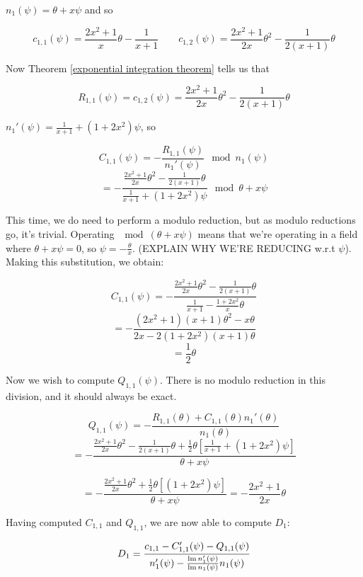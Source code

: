 $n_1(\psi) = \theta + x \psi$ and so

$$c_{1,1}(\psi) = \frac{2x^2+1}{x}\theta - \frac{1}{x+1} \qquad
c_{1,2}(\psi) = \frac{2x^2 + 1}{2x}\theta^2 - \frac{1}{2(x+1)} \theta$$

Now Theorem \ref{exponential integration theorem} tells us
that

$$R_{1,1}(\psi) = c_{1,2}(\psi) = \frac{2x^2 + 1}{2x}\theta^2 - \frac{1}{2(x+1)} \theta$$

$n_1'(\psi) = \frac{1}{x+1} + (1 + 2x^2)\psi$, so

$$C_{1,1}(\psi) = - \frac{R_{1,1}(\psi)}{n_1'(\psi)} \mod n_1(\psi)$$
$$ = - \frac{\frac{2x^2 + 1}{2x}\theta^2 - \frac{1}{2(x+1)} \theta}{\frac{1}{x+1} + (1 + 2x^2)\psi} \mod \theta + x\psi$$

This time, we do need to perform a modulo reduction, but as modulo reductions go, it's
trivial.  Operating $\mod (\theta + x\psi)$ means that we're operating in a field
where $\theta + x\psi = 0$, so $\psi = -\frac{\theta}{x}$.  (EXPLAIN WHY WE'RE
REDUCING w.r.t $\psi$).  Making this substitution, we obtain:

$$ C_{1,1}(\psi) = - \frac{\frac{2x^2 + 1}{2x}\theta^2 - \frac{1}{2(x+1)} \theta}{\frac{1}{x+1} - \frac{1 + 2x^2}{x}\theta} $$
$$ = - \frac{(2x^2 + 1)(x+1)\theta^2 - x \theta}{2x - 2(1 + 2x^2)(x+1)\theta} $$
$$ = \frac{1}{2} \theta $$

Now we wish to compute $Q_{1,1}(\psi)$.  There is no modulo reduction in
this division, and it should always be exact.

$$Q_{1,1}(\psi) = - \frac{R_{1,1}(\theta) + C_{1,1}(\theta) n_1'(\theta)}{n_1(\theta)}$$
$$ = -\frac{\frac{2x^2 + 1}{2x}\theta^2 - \frac{1}{2(x+1)} \theta + \frac{1}{2}\theta \left[\frac{1}{x+1} + (1 + 2x^2)\psi\right]}{\theta + x \psi}$$

$$ = -\frac{\frac{2x^2 + 1}{2x}\theta^2 + \frac{1}{2}\theta \left[(1 + 2x^2)\psi\right]}{\theta + x \psi}
= - \frac{2x^2 + 1}{2x} \theta$$



Having computed $C_{1,1}$ and $Q_{1,1}$, we are now able to compute $D_1$:

$$ D_1 = \frac{c_{1,1} - C_{1,1}'(\psi) - Q_{1,1}(\psi)}{n_1'(\psi) - \frac{{\rm lm\,} n_1'(\psi)}{{\rm lm\,} n_1(\psi)} n_1(\psi)}$$

